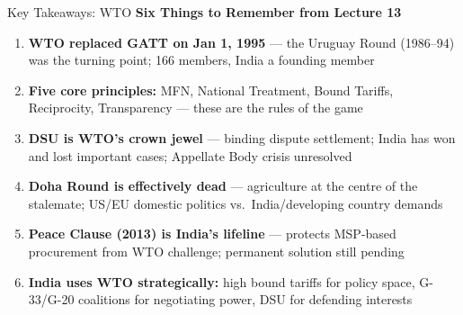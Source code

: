 \documentclass[
  ignorenonframetext,
  aspectratio=169,
]{beamer}
\makeatletter
\let\quarto@originallabel\label
\DeclareRobustCommand*{\label}[1]{\quarto@originallabel{#1}}
\makeatother
\begin{document}
\begin{frame}{Key Takeaways: WTO}
\label{key-takeaways-wto}
\textbf{Six Things to Remember from Lecture 13}

\begin{enumerate}
\item
  \textbf{WTO replaced GATT on Jan 1, 1995} --- the Uruguay Round
  (1986--94) was the turning point; 166 members, India a founding member
\item
  \textbf{Five core principles:} MFN, National Treatment, Bound Tariffs,
  Reciprocity, Transparency --- these are the rules of the game
\item
  \textbf{DSU is WTO's crown jewel} --- binding dispute settlement;
  India has won and lost important cases; Appellate Body crisis
  unresolved
\item
  \textbf{Doha Round is effectively dead} --- agriculture at the centre
  of the stalemate; US/EU domestic politics vs.~India/developing country
  demands
\item
  \textbf{Peace Clause (2013) is India's lifeline} --- protects
  MSP-based procurement from WTO challenge; permanent solution still
  pending
\item
  \textbf{India uses WTO strategically:} high bound tariffs for policy
  space, G-33/G-20 coalitions for negotiating power, DSU for defending
  interests
\end{enumerate}
\end{frame}
\end{document}
